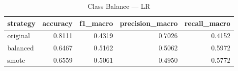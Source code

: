 \begin{table}
\caption{Class Balance — LR}
\begin{tabular}{lrrrr}
\toprule
strategy & accuracy & f1_macro & precision_macro & recall_macro \\
\midrule
original & 0.8111 & 0.4319 & 0.7026 & 0.4152 \\
balanced & 0.6467 & 0.5162 & 0.5062 & 0.5972 \\
smote & 0.6559 & 0.5061 & 0.4950 & 0.5772 \\
\bottomrule
\end{tabular}
\end{table}
